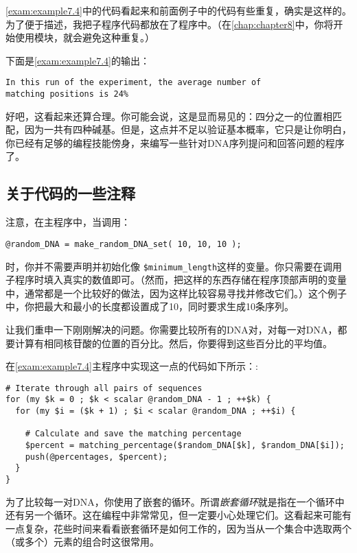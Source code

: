 \autoref{exam:example7.4}中的代码看起来和前面例子中的代码有些重复，确实是这样的。为了便于描述，我把子程序代码都放在了程序中。（在\autoref{chap:chapter8}中，你将开始使用模块，就会避免这种重复。）

下面是\autoref{exam:example7.4}的输出：

\begin{lstlisting}
In this run of the experiment, the average number of 
matching positions is 24%
\end{lstlisting}

好吧，这看起来还算合理。你可能会说，这是显而易见的：四分之一的位置相匹配，因为一共有四种碱基。但是，这点并不足以验证基本概率，它只是让你明白，你已经有足够的编程技能傍身，来编写一些针对DNA序列提问和回答问题的程序了。

\subsection{关于代码的一些注释}
注意，在主程序中，当调用：

\begin{lstlisting}
@random_DNA = make_random_DNA_set( 10, 10, 10 );
\end{lstlisting}

\noindent 时，你并不需要声明并初始化像 \verb|$minimum_length|这样的变量。你只需要在调用子程序时填入真实的数值即可。（然而，把这样的东西存储在程序顶部声明的变量中，通常都是一个比较好的做法，因为这样比较容易寻找并修改它们。）这个例子中，你把最大和最小的长度都设置成了10，同时要求生成10条序列。

让我们重申一下刚刚解决的问题。你需要比较所有的DNA对，对每一对DNA，都要计算有相同核苷酸的位置的百分比。然后，你要得到这些百分比的平均值。

在\autoref{exam:example7.4}主程序中实现这一点的代码如下所示：:

\begin{lstlisting}
# Iterate through all pairs of sequences
for (my $k = 0 ; $k < scalar @random_DNA - 1 ; ++$k) {
  for (my $i = ($k + 1) ; $i < scalar @random_DNA ; ++$i) {

    # Calculate and save the matching percentage
    $percent = matching_percentage($random_DNA[$k], $random_DNA[$i]);
    push(@percentages, $percent);
  }
}
\end{lstlisting}

为了比较每一对DNA，你使用了嵌套的循环。所谓\textit{嵌套循环}就是指在一个循环中还有另一个循环。这在编程中非常常见，但一定要小心处理它们。这看起来可能有一点复杂，花些时间来看看嵌套循环是如何工作的，因为当从一个集合中选取两个（或多个）元素的组合时这很常用。

